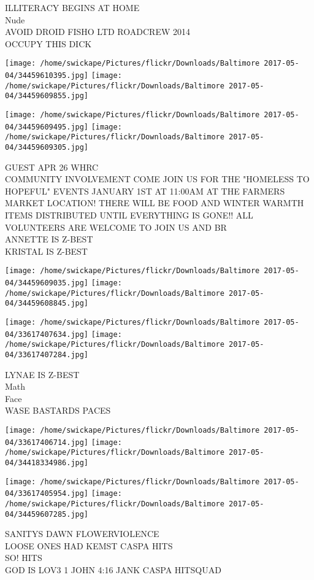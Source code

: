 \documentclass[10pt,letterpaper]{article}
\begin{document}
ILLITERACY BEGINS AT HOME\\
Nude\\
AVOID DROID FISHO LTD ROADCREW 2014\\
OCCUPY THIS DICK
\pagebreak

\texttt{[image: /home/swickape/Pictures/flickr/Downloads/Baltimore 2017-05-04/34459610395.jpg]}
\texttt{[image: /home/swickape/Pictures/flickr/Downloads/Baltimore 2017-05-04/34459609855.jpg]}

\texttt{[image: /home/swickape/Pictures/flickr/Downloads/Baltimore 2017-05-04/34459609495.jpg]}
\texttt{[image: /home/swickape/Pictures/flickr/Downloads/Baltimore 2017-05-04/34459609305.jpg]}

GUEST APR 26 WHRC\\
COMMUNITY INVOLVEMENT COME JOIN US FOR THE "HOMELESS TO HOPEFUL" EVENTS JANUARY 1ST AT 11:00AM AT THE FARMERS MARKET LOCATION!  THERE WILL BE FOOD AND WINTER WARMTH ITEMS DISTRIBUTED UNTIL EVERYTHING IS GONE!!  ALL VOLUNTEERS ARE WELCOME TO JOIN US AND BR\\
ANNETTE IS Z{-}BEST\\
KRISTAL IS Z{-}BEST
\pagebreak

\texttt{[image: /home/swickape/Pictures/flickr/Downloads/Baltimore 2017-05-04/34459609035.jpg]}
\texttt{[image: /home/swickape/Pictures/flickr/Downloads/Baltimore 2017-05-04/34459608845.jpg]}

\texttt{[image: /home/swickape/Pictures/flickr/Downloads/Baltimore 2017-05-04/33617407634.jpg]}
\texttt{[image: /home/swickape/Pictures/flickr/Downloads/Baltimore 2017-05-04/33617407284.jpg]}

LYNAE IS Z{-}BEST\\
Math\\
Face\\
WASE BASTARDS PACES
\pagebreak

\texttt{[image: /home/swickape/Pictures/flickr/Downloads/Baltimore 2017-05-04/33617406714.jpg]}
\texttt{[image: /home/swickape/Pictures/flickr/Downloads/Baltimore 2017-05-04/34418334986.jpg]}

\texttt{[image: /home/swickape/Pictures/flickr/Downloads/Baltimore 2017-05-04/33617405954.jpg]}
\texttt{[image: /home/swickape/Pictures/flickr/Downloads/Baltimore 2017-05-04/34459607285.jpg]}

SANITYS DAWN FLOWERVIOLENCE\\
LOOSE ONES HAD KEMST CASPA HITS\\
SO!  HITS\\
GOD IS LOV3 1 JOHN 4:16 JANK CASPA HITSQUAD
\pagebreak
\end{document}
